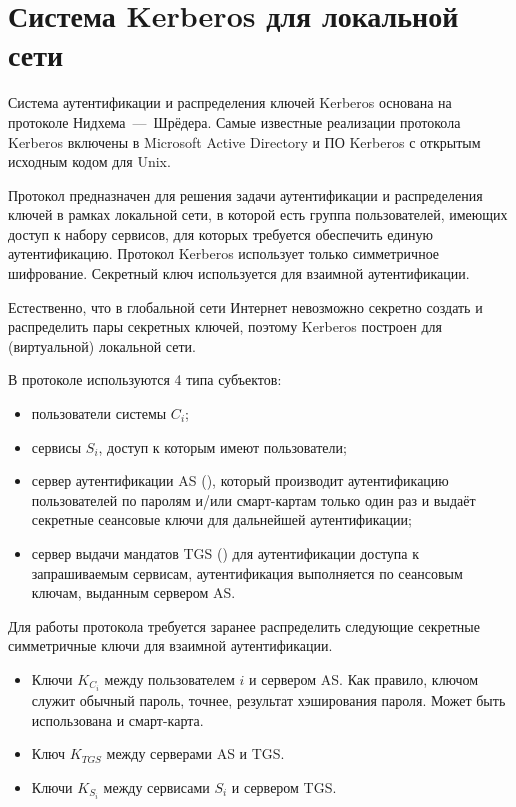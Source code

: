 \section{Система Kerberos для локальной сети}\label{section-kerberos}

Система аутентификации и распределения ключей Kerberos основана на протоколе Нидхема~---~Шрёдера. Самые известные реализации протокола Kerberos включены в Microsoft Active Directory и ПО Kerberos с открытым исходным кодом для Unix.

Протокол предназначен для решения задачи аутентификации и распределения ключей в рамках локальной сети, в которой есть группа пользователей, имеющих доступ к набору сервисов, для которых требуется обеспечить единую аутентификацию. Протокол Kerberos использует только симметричное шифрование. Секретный ключ используется для взаимной аутентификации.

Естественно, что в глобальной сети Интернет невозможно секретно создать и распределить пары секретных ключей, поэтому Kerberos построен для (виртуальной) локальной сети.

В протоколе используются 4 типа субъектов:

\begin{itemize}
    \item пользователи системы $C_i$;
    \item сервисы $S_i$, доступ к которым имеют пользователи;
    \item сервер аутентификации AS (), который производит аутентификацию пользователей по паролям и/или смарт-картам только один раз и выдаёт секретные сеансовые ключи для дальнейшей аутентификации;
    \item сервер выдачи мандатов TGS () для аутентификации доступа к запрашиваемым сервисам, аутентификация выполняется по сеансовым ключам, выданным сервером AS.
\end{itemize}

Для работы протокола требуется заранее распределить следующие секретные симметричные ключи для взаимной аутентификации.
\begin{itemize}
    \item Ключи $K_{C_i}$ между пользователем $i$ и сервером AS. Как правило, ключом служит обычный пароль, точнее, результат хэширования пароля. Может быть использована и смарт-карта.
    \item Ключ $K_{TGS}$ между серверами AS и TGS.
    \item Ключи $K_{S_i}$ между сервисами $S_i$ и сервером TGS.
\end{itemize}

